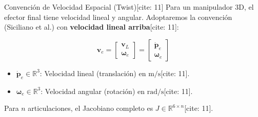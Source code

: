 \documentclass[aspectratio=169, xcolor={table,xcdraw}]{beamer}
\begin{document}
\begin{frame}{Convención de Velocidad Espacial (Twist)[cite: 11]}
    Para un manipulador 3D, el efector final tiene velocidad lineal y angular. Adoptaremos la convención (Siciliano et al.) con \textbf{velocidad lineal arriba}[cite: 11]:
    
    \begin{equation*}
        \boxed{
        \mathbf{v}_e=
        \begin{bmatrix}
        \mathbf{v}_L\\
        \boldsymbol\omega_e
        \end{bmatrix}
        =
        \begin{bmatrix}
        \dot{\mathbf{p}}_e\\
        \boldsymbol\omega_e
        \end{bmatrix}
        }
    \end{equation*}
    
    \begin{itemize}
        \item $\dot{\mathbf{p}}_e \in \mathbb{R}^3$: Velocidad lineal (translación) en $\mathrm{m/s}$[cite: 11].
        \item $\boldsymbol\omega_e \in \mathbb{R}^3$: Velocidad angular (rotación) en $\mathrm{rad/s}$[cite: 11].
    \end{itemize}
    \vfill
    Para $n$ articulaciones, el Jacobiano completo es $J \in \mathbb{R}^{6 \times n}$[cite: 11].
\end{frame}
\end{document}
